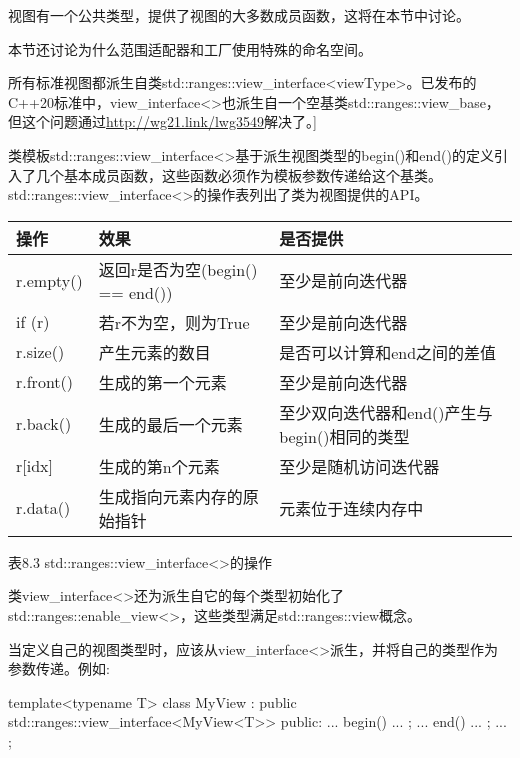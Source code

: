 
视图有一个公共类型，提供了视图的大多数成员函数，这将在本节中讨论。

本节还讨论为什么范围适配器和工厂使用特殊的命名空间。


所有标准视图都派生自类std::ranges::view\_interface<viewType>。已发布的C++20标准中，view\_interface<>也派生自一个空基类std::ranges::view\_base，但这个问题通过\url{http://wg21.link/lwg3549}解决了。]

类模板std::ranges::view\_interface<>基于派生视图类型的begin()和end()的定义引入了几个基本成员函数，这些函数必须作为模板参数传递给这个基类。std::ranges::view\_interface<>的操作表列出了类为视图提供的API。

\begin{longtable}[c]{|l|l|l|}
\hline
\textbf{操作} & \textbf{效果}                             & \textbf{是否提供}                       \\ \hline
\endfirsthead
%
\endhead
%
r.empty()          & 返回r是否为空(begin() == end()) & 至少是前向迭代器                 \\ \hline
if (r)             & 若r不为空，则为True                      & 至少是前向迭代器                 \\ \hline
r.size()           & 产生元素的数目               & 是否可以计算和end之间的差值 \\ \hline
r.front()          & 生成的第一个元素                    & 至少是前向迭代器                 \\ \hline
r.back() & 生成的最后一个元素                            & 至少双向迭代器和end()产生与begin()相同的类型 \\ \hline
r{[}idx{]}         & 生成的第n个元素                     & 至少是随机访问迭代器           \\ \hline
r.data() & 生成指向元素内存的原始指针 & 元素位于连续内存中                                          \\ \hline
\end{longtable}

\begin{center}
表8.3 std::ranges::view\_interface<>的操作
\end{center}

类view\_interface<>还为派生自它的每个类型初始化了std::ranges::enable\_view<>，这些类型满足std::ranges::view概念。

当定义自己的视图类型时，应该从view\_interface<>派生，并将自己的类型作为参数传递。例如:

\begin{cpp}
template<typename T>
class MyView : public std::ranges::view_interface<MyView<T>> {
	public:
	... begin() ... ;
	... end() ... ;
	...
};
\end{cpp}

